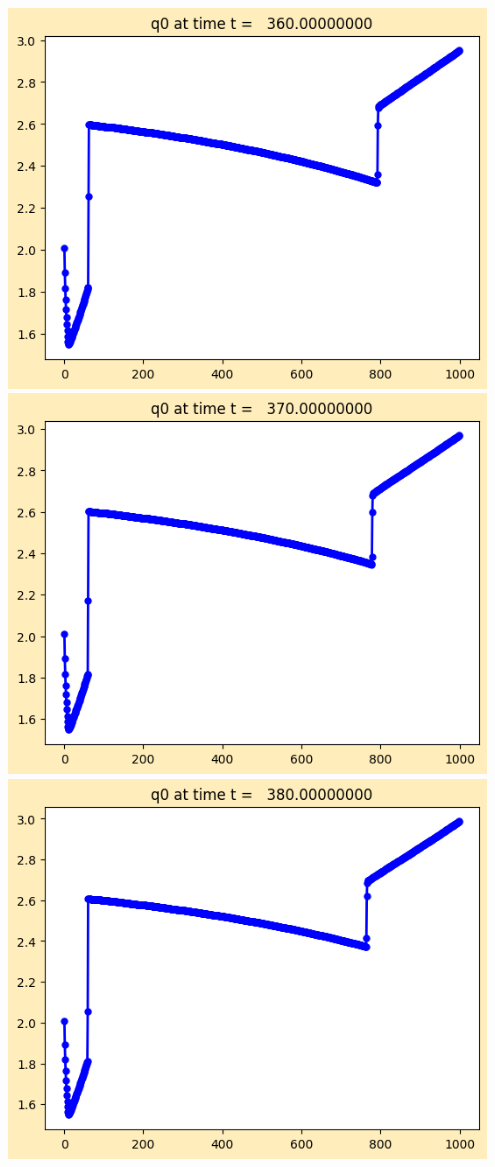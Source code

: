 \documentclass[11pt]{article}
\begin{document}
\vskip 10pt 
\includegraphics[width=0.95\textwidth]{frame0036fig1.png}
\vskip 10pt 
\includegraphics[width=0.95\textwidth]{frame0037fig1.png}
\vskip 10pt 
\includegraphics[width=0.95\textwidth]{frame0038fig1.png}
\end{document}
